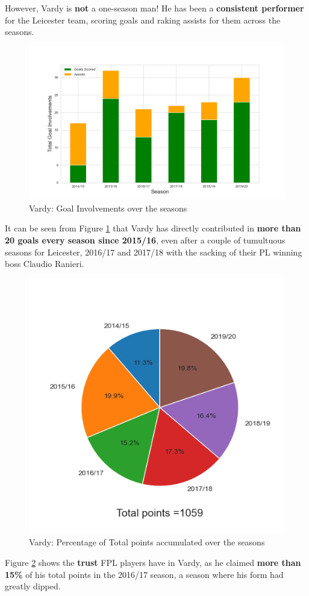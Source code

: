 \documentclass{article}
\begin{document}
However, Vardy is \textbf{not} a one-season man! He has been a \textbf{consistent performer} for the Leicester team, scoring goals and raking assists for them across the seasons.

\begin{figure}[H]
    \centering
    \includegraphics[width=1\linewidth]{assets/goalinvolv_season.png}
    \caption{Vardy: Goal Involvements over the seasons}
    \label{fig:goalinvolv_season}
\end{figure}
It can be seen from Figure \ref{fig:goalinvolv_season} that Vardy has directly contributed in \textbf{more than 20 goals every season since 2015/16}, even after a couple of tumultuous seasons for Leicester, 2016/17 and 2017/18 with the sacking of their PL winning boss Claudio Ranieri.

\begin{figure}[H]
    \centering
    \includegraphics[width=0.5\linewidth]{assets/points_season.png}
    \caption{Vardy: Percentage of Total points accumulated over the seasons}
    \label{fig:points}
\end{figure}

Figure \ref{fig:points} shows the \textbf{trust} FPL players have in Vardy, as he claimed \textbf{more than 15\%} of his total points in the 2016/17 season, a season where his form had greatly dipped.
\end{document}
